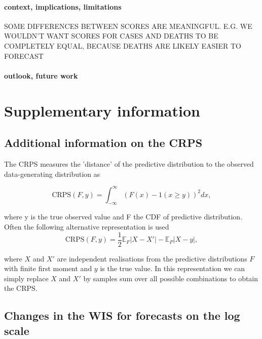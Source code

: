\documentclass{article}
\begin{document}
\paragraph{context, implications, limitations}

SOME DIFFERENCES BETWEEN SCORES ARE MEANINGFUL. E.G. WE WOULDN'T WANT SCORES FOR CASES AND DEATHS TO BE COMPLETELY EQUAL, BECAUSE DEATHS ARE LIKELY EASIER TO FORECAST

\paragraph{outlook, future work}


 




\newpage

\appendix
\section{Supplementary information}


\subsection{Additional information on the CRPS} \label{crps}

The CRPS measures the 'distance' of the predictive distribution to the observed data-generating distribution as 

\begin{equation}
    \text{CRPS}(F, y) = \int_{-\infty}^\infty \left( F(x) - 1(x \geq y) \right)^2 dx,
\end{equation}

where y is the true observed value and F the CDF of predictive distribution. Often the following alternative representation is used
\begin{equation}
    \text{CRPS}(F, y) = \frac{1}{2} \mathbb{E}_{F} |X - X'| - \mathbb{E}_P |X - y|,
\end{equation}
  
where $X$ and $X'$ are independent realisations from the predictive distributions $F$ with finite first moment and $y$ is the true value. In this representation we can simply replace $X$ and $X'$ by samples sum over all possible combinations to obtain the CRPS.  


\subsection{Changes in the WIS for forecasts on the log scale} \label{wis-log-derivation}
\end{document}
